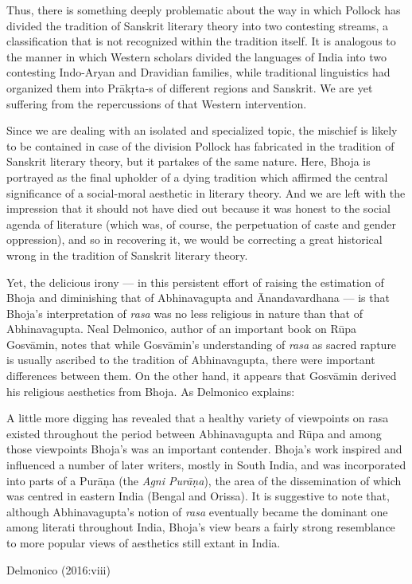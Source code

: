 Thus, there is something deeply problematic about the way in which Pollock has divided the tradition of Sanskrit literary theory into two contesting streams, a classification that is not recognized within the tradition itself. It is analogous to the manner in which Western scholars divided the languages of India into two contesting Indo-Aryan and Dravidian families, while traditional linguistics had organized them into Prākṛta-s of different regions and Sanskrit. We are yet suffering from the repercussions of that Western intervention. 

Since we are dealing with an isolated and specialized topic, the mischief is likely to be contained in case of the division Pollock has fabricated in the tradition of Sanskrit literary theory, but it partakes of the same nature. Here, Bhoja is portrayed as the final upholder of a dying tradition which affirmed the central significance of a social-moral aesthetic in literary theory. And we are left with the impression that it should not have died out because it was honest to the social agenda of literature (which was, of course, the perpetuation of caste and gender oppression), and so in recovering it, we would be correcting a great historical wrong in the tradition of Sanskrit literary theory.

Yet, the delicious irony --- in this persistent effort of raising the estimation of Bhoja and diminishing that of Abhinavagupta and Ānandavardhana --- is that Bhoja's interpretation of \textsl{rasa} was no less religious in nature than that of Abhinavagupta. Neal Delmonico, author of an important book on Rūpa Gosvāmin, notes that while Gosvāmin's understanding of \textsl{rasa} as sacred rapture is usually ascribed to the tradition of Abhinavagupta, there were important differences between them. On the other hand, it appears that Gosvāmin derived his religious aesthetics from Bhoja. As Delmonico explains:

\begin{myquote}
A little more digging has revealed that a healthy variety of viewpoints on rasa existed throughout the period between Abhinavagupta and Rūpa and among those viewpoints Bhoja's was an important contender. Bhoja's work inspired and influenced a number of later writers, mostly in South India, and was incorporated into parts of a Purāṇa (the \textsl{Agni Purāṇa}), the area of the dissemination of which was centred in eastern India (Bengal and Orissa). It is suggestive to note that, although Abhinavagupta's notion of \textsl{rasa} eventually became the dominant one among literati throughout India, Bhoja's view bears a fairly strong resemblance to more popular views of aesthetics still extant in India.

\hfill Delmonico (2016:viii)
\end{myquote}

